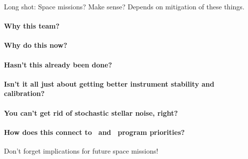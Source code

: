 \documentclass[12pt, letterpaper]{article}
\begin{document}
Long shot: Space missions? Make sense? Depends on mitigation of these things.








\paragraph{Why this team?}

\paragraph{Why do this now?}

\paragraph{Hasn't this already been done?}

\paragraph{Isn't it all just about getting better instrument stability and calibration?}

\paragraph{You can't get rid of stochastic stellar noise, right?}

\paragraph{How does this connect to \NASA\ and \XRP\ program priorities?}

Don't forget implications for future space missions!
\end{document}
